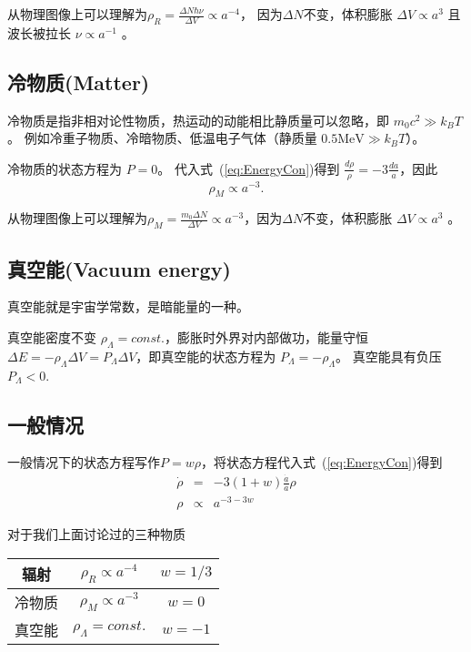 \documentclass[12pt]{ctexart}
\newcommand{\refeq}[1]{式~(\ref{#1})}
\begin{document}
从物理图像上可以理解为$\rho_R = \frac{\Delta N \hbar\nu }{\Delta V}\propto a^{-4}$， 因为$\Delta N$不变，体积膨胀 $\Delta V \propto a^{3}$ 且 波长被拉长 $\nu \propto a^{-1}$ 。

\subsection{冷物质(Matter)}

冷物质是指非相对论性物质，热运动的动能相比静质量可以忽略，即 $m_0 c^2 \gg k_B T$。
例如冷重子物质、冷暗物质、低温电子气体（静质量 $0.5 \mathrm{MeV} \gg k_B T$）。

冷物质的状态方程为 $P=0$。
代入\refeq{eq:EnergyCon}得到 $\frac{d\rho}{\rho} = -3\frac{da}{a}$，因此
\begin{equation}
    \rho_M\propto a^{-3}.
\end{equation} 

从物理图像上可以理解为$\rho_M = \frac{m_0 \Delta N}{\Delta V}\propto a^{-3}$，因为$\Delta N$不变，体积膨胀 $\Delta V \propto a^{3}$ 。

\subsection{真空能(Vacuum energy)}

真空能就是宇宙学常数，是暗能量的一种。

真空能密度不变 $\rho_\Lambda=const.$，膨胀时外界对内部做功，能量守恒$\Delta E = -\rho_\Lambda \Delta V = P_\Lambda \Delta V$，即真空能的状态方程为 $P_\Lambda = -\rho_\Lambda$。 真空能具有负压 $P_\Lambda < 0 $.

\subsection{一般情况}

一般情况下的状态方程写作$P=w\rho$，将状态方程代入\refeq{eq:EnergyCon}得到
\begin{eqnarray}
    \dot{\rho} &=& -3(1+w) \frac{\dot{a}}{a} \rho 
    \\ \rho &\propto& a^{-3-3w}
\end{eqnarray}

对于我们上面讨论过的三种物质
\begin{table}[htb]
    \centering
    \begin{tabular}{|c|c|c|}
    \hline
    辐射  & $\rho_R\propto a^{-4}$ & $w=1/3$ \\ \hline
    冷物质 & $\rho_M\propto a^{-3}$ & $w=0$   \\ \hline
    真空能 & $\rho_\Lambda=const.$  & $w=-1$  \\ \hline
    \end{tabular}
\end{table}
\end{document}
